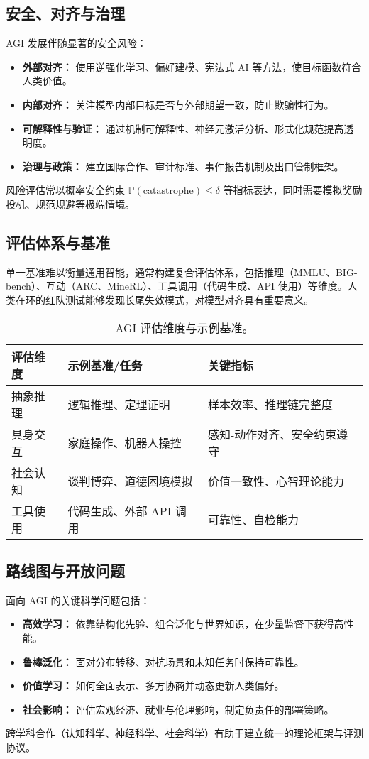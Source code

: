 \documentclass[UTF8,zihao=-4]{ctexart}
\begin{document}
\subsection{安全、对齐与治理}
AGI 发展伴随显著的安全风险：
\begin{itemize}
  \item \textbf{外部对齐：} 使用逆强化学习、偏好建模、宪法式 AI 等方法，使目标函数符合人类价值。
  \item \textbf{内部对齐：} 关注模型内部目标是否与外部期望一致，防止欺骗性行为。
  \item \textbf{可解释性与验证：} 通过机制可解释性、神经元激活分析、形式化规范提高透明度。
  \item \textbf{治理与政策：} 建立国际合作、审计标准、事件报告机制及出口管制框架。
\end{itemize}
风险评估常以概率安全约束 $\mathbb{P}(\text{catastrophe}) \le \delta$ 等指标表达，同时需要模拟奖励投机、规范规避等极端情境。

\subsection{评估体系与基准}
单一基准难以衡量通用智能，通常构建复合评估体系，包括推理（MMLU、BIG-bench）、互动（ARC、MineRL）、工具调用（代码生成、API 使用）等维度。人类在环的红队测试能够发现长尾失效模式，对模型对齐具有重要意义。

\begin{table}[H]
  \centering
  \caption{AGI 评估维度与示例基准。}
  \begin{tabular}{p{} p{} p{}}
    \toprule
    评估维度 & 示例基准/任务 & 关键指标 \\
    \midrule
    抽象推理 & 逻辑推理、定理证明 & 样本效率、推理链完整度 \\
    具身交互 & 家庭操作、机器人操控 & 感知-动作对齐、安全约束遵守 \\
    社会认知 & 谈判博弈、道德困境模拟 & 价值一致性、心智理论能力 \\
    工具使用 & 代码生成、外部 API 调用 & 可靠性、自检能力 \\
    \bottomrule
  \end{tabular}
  \label{tab:agi_eval}
\end{table}

\subsection{路线图与开放问题}
面向 AGI 的关键科学问题包括：
\begin{itemize}
  \item \textbf{高效学习：} 依靠结构化先验、组合泛化与世界知识，在少量监督下获得高性能。
  \item \textbf{鲁棒泛化：} 面对分布转移、对抗场景和未知任务时保持可靠性。
  \item \textbf{价值学习：} 如何全面表示、多方协商并动态更新人类偏好。
  \item \textbf{社会影响：} 评估宏观经济、就业与伦理影响，制定负责任的部署策略。
\end{itemize}
跨学科合作（认知科学、神经科学、社会科学）有助于建立统一的理论框架与评测协议。
\FloatBarrier
\end{document}
